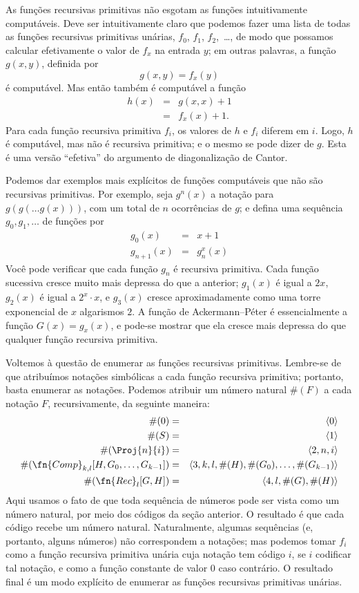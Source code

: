 \documentclass[../../../include/open-logic-section]{subfiles}
\begin{document}

As funções recursivas primitivas não esgotam as funções intuitivamente
computáveis. Deve ser intuitivamente claro que podemos fazer uma lista
de todas as funções recursivas primitivas unárias,
$f_0$, $f_1$, $f_2$,~\dots, de modo que possamos calcular efetivamente
o valor de $f_x$ na entrada $y$; em outras palavras, a função $g(x,y)$,
definida por
\[
g(x,y) = f_x(y)
\]
é computável. Mas então também é computável a função
\begin{eqnarray*}
h(x) & = & g(x,x) + 1 \\
& = & f_x(x) +1.
\end{eqnarray*}
Para cada função recursiva primitiva $f_i$, os valores de $h$ e
$f_i$ diferem em $i$. Logo, $h$ é computável, mas não é recursiva
primitiva; e o mesmo se pode dizer de $g$. Esta é uma versão
``efetiva'' do argumento de diagonalização de Cantor.

Podemos dar exemplos mais explícitos de funções computáveis que não
são recursivas primitivas. Por exemplo, seja $g^n(x)$ a notação para
$g(g(\dots g(x)))$, com um total de $n$ ocorrências de $g$; e defina
uma sequência $g_0,g_1,\dots$ de funções por
\begin{eqnarray*}
g_0(x) & = & x+1 \\
g_{n + 1}(x) & = & g_n^x(x)
\end{eqnarray*}
Você pode verificar que cada função $g_n$ é recursiva primitiva.
Cada função sucessiva cresce muito mais depressa do que a anterior;
$g_1(x)$ é igual a $2x$, $g_2(x)$ é igual a $2^x \cdot x$, e
$g_3(x)$ cresce aproximadamente como uma torre exponencial de $x$
algarismos $2$. A função de Ackermann--P\'eter é essencialmente a
função $G(x) = g_x(x)$, e pode-se mostrar que ela cresce mais depressa
do que qualquer função recursiva primitiva.

Voltemos à questão de enumerar as funções recursivas primitivas.
Lembre-se de que atribuímos notações simbólicas a cada função recursiva
primitiva; portanto, basta enumerar as notações. Podemos atribuir um
número natural $\#(F)$ a cada notação $F$, recursivamente, da seguinte
maneira:
\begin{eqnarray*}
\#(0) & = & \langle 0 \rangle \\
\#(S) & = & \langle 1 \rangle \\
\#(\Proj{n}{i}) & = & \langle 2, n, i \rangle \\
\#(\fn{Comp}_{k,l}[H,G_0,\dots,G_{k-1}]) & = & \langle
3,k,l,\#(H),\#(G_0),\dots,\#(G_{k-1}) \rangle \\
\#(\fn{Rec}_l[G,H]) & = & \langle 4, l, \#(G), \#(H) \rangle
\end{eqnarray*}
Aqui usamos o fato de que toda sequência de números pode ser vista como
um número natural, por meio dos códigos da seção anterior. O resultado
é que cada código recebe um número natural. Naturalmente, algumas
sequências (e, portanto, alguns números) não correspondem a notações;
mas podemos tomar $f_i$ como a função recursiva primitiva unária cuja
notação tem código $i$, se $i$ codificar tal notação, e como a função
constante de valor $0$ caso contrário. O resultado final é um modo
explícito de enumerar as funções recursivas primitivas unárias.
\end{document}
